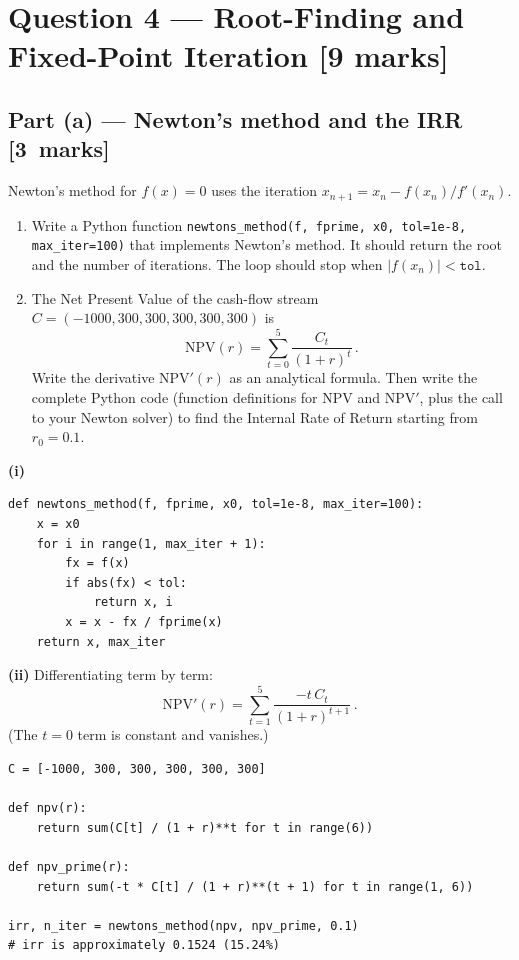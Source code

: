 \documentclass[11pt,a4paper]{article}
\newcommand{\mkpts}[1]{\hfill\textbf{[#1~marks]}}
\begin{document}
\section*{Question 4 --- Root-Finding and Fixed-Point Iteration \hfill [9 marks]}

\subsection*{Part (a) --- Newton's method and the IRR \mkpts{3}}

Newton's method for $f(x)=0$ uses the iteration $x_{n+1} = x_n - f(x_n)/f'(x_n)$.

\begin{enumerate}[label=(\roman*),nosep]
\item Write a Python function \texttt{newtons\_method(f, fprime, x0, tol=1e-8, max\_iter=100)} that implements Newton's method.  It should return the root and the number of iterations.  The loop should stop when $|f(x_n)| < \texttt{tol}$.
\item The Net Present Value of the cash-flow stream $C=(-1000, 300, 300, 300, 300, 300)$ is
\[
\text{NPV}(r) = \sum_{t=0}^{5} \frac{C_t}{(1+r)^t}\,.
\]
Write the derivative $\text{NPV}'(r)$ as an analytical formula.  Then write the complete Python code (function definitions for NPV and NPV$'$, plus the call to your Newton solver) to find the Internal Rate of Return starting from $r_0 = 0.1$.
\end{enumerate}

\begin{solution}
\textbf{(i)}
\begin{lstlisting}[numbers=none]
def newtons_method(f, fprime, x0, tol=1e-8, max_iter=100):
    x = x0
    for i in range(1, max_iter + 1):
        fx = f(x)
        if abs(fx) < tol:
            return x, i
        x = x - fx / fprime(x)
    return x, max_iter
\end{lstlisting}

\textbf{(ii)} Differentiating term by term:
\[
\text{NPV}'(r) = \sum_{t=1}^{5} \frac{-t\, C_t}{(1+r)^{t+1}}\,.
\]
(The $t=0$ term is constant and vanishes.)

\begin{lstlisting}[numbers=none]
C = [-1000, 300, 300, 300, 300, 300]

def npv(r):
    return sum(C[t] / (1 + r)**t for t in range(6))

def npv_prime(r):
    return sum(-t * C[t] / (1 + r)**(t + 1) for t in range(1, 6))

irr, n_iter = newtons_method(npv, npv_prime, 0.1)
# irr is approximately 0.1524 (15.24%)
\end{lstlisting}
\end{solution}
\end{document}
